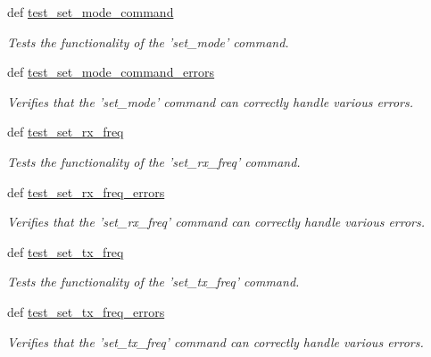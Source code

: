 \begin{DoxyCompactItemize}
\item 
def \hyperlink{classhwm_1_1hardware_1_1devices_1_1drivers_1_1icom__910_1_1tests_1_1test__icom__910_1_1_test_i_c_o_m910_handler_acd1d8bfe169987ee66a3224ffe51c682}{test\-\_\-set\-\_\-mode\-\_\-command}
\begin{DoxyCompactList}\small\item\em Tests the functionality of the 'set\-\_\-mode' command. \end{DoxyCompactList}\item 
def \hyperlink{classhwm_1_1hardware_1_1devices_1_1drivers_1_1icom__910_1_1tests_1_1test__icom__910_1_1_test_i_c_o_m910_handler_ae8315f0bcaff451649df66037e73c1d1}{test\-\_\-set\-\_\-mode\-\_\-command\-\_\-errors}
\begin{DoxyCompactList}\small\item\em Verifies that the 'set\-\_\-mode' command can correctly handle various errors. \end{DoxyCompactList}\item 
def \hyperlink{classhwm_1_1hardware_1_1devices_1_1drivers_1_1icom__910_1_1tests_1_1test__icom__910_1_1_test_i_c_o_m910_handler_a37fb897d3ca41350f78139c33627602d}{test\-\_\-set\-\_\-rx\-\_\-freq}
\begin{DoxyCompactList}\small\item\em Tests the functionality of the 'set\-\_\-rx\-\_\-freq' command. \end{DoxyCompactList}\item 
def \hyperlink{classhwm_1_1hardware_1_1devices_1_1drivers_1_1icom__910_1_1tests_1_1test__icom__910_1_1_test_i_c_o_m910_handler_a716d2ab28c8680ad5a1fb1d6add555af}{test\-\_\-set\-\_\-rx\-\_\-freq\-\_\-errors}
\begin{DoxyCompactList}\small\item\em Verifies that the 'set\-\_\-rx\-\_\-freq' command can correctly handle various errors. \end{DoxyCompactList}\item 
def \hyperlink{classhwm_1_1hardware_1_1devices_1_1drivers_1_1icom__910_1_1tests_1_1test__icom__910_1_1_test_i_c_o_m910_handler_ab9e8f75fd604283f03450a22db44b3cf}{test\-\_\-set\-\_\-tx\-\_\-freq}
\begin{DoxyCompactList}\small\item\em Tests the functionality of the 'set\-\_\-tx\-\_\-freq' command. \end{DoxyCompactList}\item 
def \hyperlink{classhwm_1_1hardware_1_1devices_1_1drivers_1_1icom__910_1_1tests_1_1test__icom__910_1_1_test_i_c_o_m910_handler_ac4e98b9e89d5df9aacb24240bbb9a412}{test\-\_\-set\-\_\-tx\-\_\-freq\-\_\-errors}
\begin{DoxyCompactList}\small\item\em Verifies that the 'set\-\_\-tx\-\_\-freq' command can correctly handle various errors. \end{DoxyCompactList}\end{DoxyCompactItemize}

